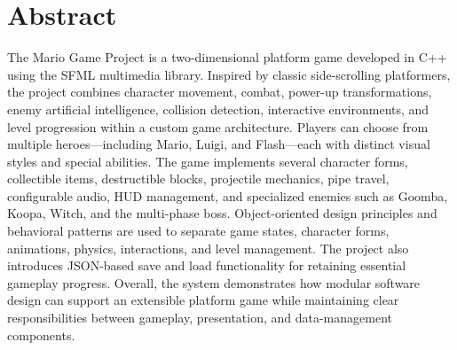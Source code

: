 \section{Abstract}
The Mario Game Project is a two-dimensional platform game developed in C++ using the SFML multimedia library. Inspired by classic side-scrolling platformers, the project combines character movement, combat, power-up transformations, enemy artificial intelligence, collision detection, interactive environments, and level progression within a custom game architecture. Players can choose from multiple heroes—including Mario, Luigi, and Flash—each with distinct visual styles and special abilities. The game implements several character forms, collectible items, destructible blocks, projectile mechanics, pipe travel, configurable audio, HUD management, and specialized enemies such as Goomba, Koopa, Witch, and the multi-phase boss. Object-oriented design principles and behavioral patterns are used to separate game states, character forms, animations, physics, interactions, and level management. The project also introduces JSON-based save and load functionality for retaining essential gameplay progress. Overall, the system demonstrates how modular software design can support an extensible platform game while maintaining clear responsibilities between gameplay, presentation, and data-management components.
